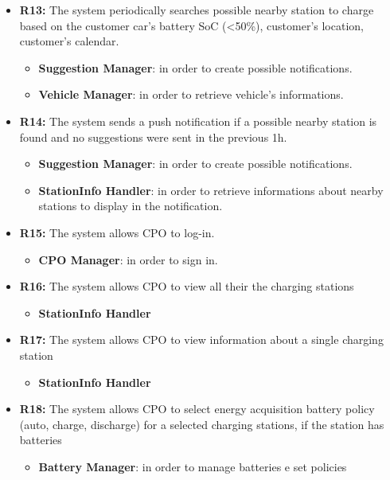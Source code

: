 \begin{itemize}
\begin{itemize}
          \end{itemize}
          \item \textbf{R13:} The system periodically searches possible nearby station to charge based on the customer car's battery SoC (<50\%), customer's location, customer's calendar.
          \begin{itemize}
              \item \textbf{Suggestion Manager}: in order to create possible notifications.
              \item \textbf{Vehicle Manager}: in order to retrieve vehicle's informations.
          \end{itemize}
          \item \textbf{R14:} The system sends a push notification if a possible nearby station is found and no suggestions were sent in the previous 1h.
          \begin{itemize}
            \item \textbf{Suggestion Manager}: in order to create possible notifications.
              \item \textbf{StationInfo Handler}: in order to retrieve informations about nearby stations to display in the notification.
          \end{itemize}
          \item \textbf{R15:} The system allows CPO to log-in.
          \begin{itemize}
              \item \textbf{CPO Manager}: in order to sign in.
              
          \end{itemize}
          \item \textbf{R16:} The system allows CPO to view all their the charging stations
          \begin{itemize}
              \item \textbf{StationInfo Handler}              
          \end{itemize}
          \item \textbf{R17:} The system allows CPO to view information about a single charging station
          \begin{itemize}
              \item \textbf{StationInfo Handler}
              
          \end{itemize}
          \item \textbf{R18:} The system allows CPO to select energy acquisition battery policy (auto, charge, discharge) for a selected charging stations, if the station has batteries
          \begin{itemize}
              \item \textbf{Battery Manager}: in order to manage batteries e set policies
              

\end{itemize}
\end{itemize}
